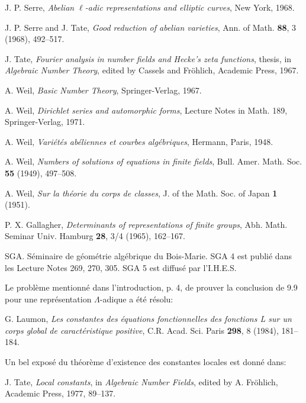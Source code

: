 \documentclass[10pt]{article}
\begin{document}
\begin{enumerate}[label={[\arabic*]},leftmargin=2.8em]
\item J. P. Serre, \emph{Abelian \(\ell\)-adic representations and elliptic curves}, New York, 1968.
\item J. P. Serre and J. Tate, \emph{Good reduction of abelian varieties}, Ann. of Math. \textbf{88}, 3 (1968), 492--517.
\item J. Tate, \emph{Fourier analysis in number fields and Hecke's zeta functions}, thesis, in \emph{Algebraic Number Theory}, edited by Cassels and Fröhlich, Academic Press, 1967.
\item A. Weil, \emph{Basic Number Theory}, Springer-Verlag, 1967.
\item A. Weil, \emph{Dirichlet series and automorphic forms}, Lecture Notes in Math. 189, Springer-Verlag, 1971.
\item A. Weil, \emph{Variétés abéliennes et courbes algébriques}, Hermann, Paris, 1948.
\item A. Weil, \emph{Numbers of solutions of equations in finite fields}, Bull. Amer. Math. Soc. \textbf{55} (1949), 497--508.
\item A. Weil, \emph{Sur la théorie du corps de classes}, J. of the Math. Soc. of Japan \textbf{1} (1951).
\item P. X. Gallagher, \emph{Determinants of representations of finite groups}, Abh. Math. Seminar Univ. Hamburg \textbf{28}, 3/4 (1965), 162--167.
\end{enumerate}

\noindent SGA. Séminaire de géométrie algébrique du Bois-Marie. SGA 4 est publié dans les Lecture Notes 269, 270, 305. SGA 5 est diffusé par l'I.H.E.S.

\medskip
\noindent Le problème mentionné dans l'introduction, p. 4, de prouver la conclusion de 9.9 pour une représentation \(\Lambda\)-adique a été résolu:

\noindent G. Laumon, \emph{Les constantes des équations fonctionnelles des fonctions L sur un corps global de caractéristique positive}, C.R. Acad. Sci. Paris \textbf{298}, 8 (1984), 181--184.

\medskip
\noindent Un bel exposé du théorème d'existence des constantes locales est donné dans:

\noindent J. Tate, \emph{Local constants}, in \emph{Algebraic Number Fields}, edited by A. Fröhlich, Academic Press, 1977, 89--137.
\end{document}
